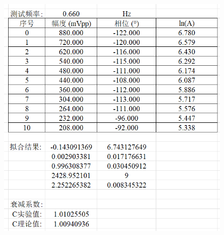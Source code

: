 \documentclass{customDoc}
\begin{document}
\begin{figure}[H]
  \centering
  \includegraphics[width=\textwidth]{originData-5.png}
\end{figure}
\end{document}
